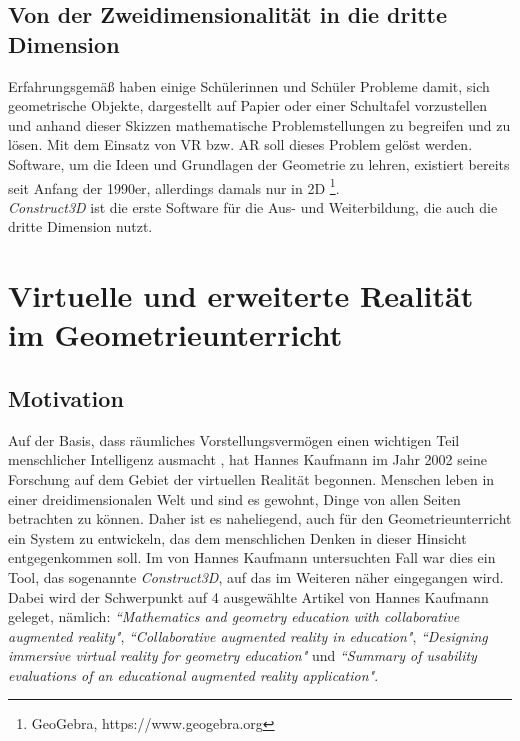 \documentclass[deutsch]{llncs}
\begin{document}
\subsection{Von der Zweidimensionalität in die dritte Dimension}
Erfahrungsgemäß haben einige Schülerinnen und Schüler Probleme damit, sich geometrische Objekte, dargestellt auf Papier oder einer Schultafel vorzustellen und anhand dieser Skizzen mathematische Problemstellungen zu begreifen und zu lösen. Mit dem Einsatz von VR bzw. AR soll dieses Problem gelöst werden.\\
Software, um die Ideen und Grundlagen der Geometrie zu lehren, existiert bereits seit Anfang der 1990er, allerdings damals nur in 2D \footnote{GeoGebra, https://www.geogebra.org}. \\
\emph{Construct3D} ist die erste Software für die Aus- und Weiterbildung, die auch die dritte Dimension nutzt. %
\section{Virtuelle und erweiterte Realität im Geometrieunterricht}
\subsection{Motivation}
Auf der Basis, dass räumliches Vorstellungsvermögen einen wichtigen Teil menschlicher Intelligenz ausmacht \cite{spatial}, hat Hannes Kaufmann im Jahr 2002 seine Forschung auf dem Gebiet der virtuellen Realität begonnen.
Menschen leben in einer dreidimensionalen Welt und sind es gewohnt, Dinge von allen Seiten betrachten zu können. Daher ist es naheliegend, auch für den Geometrieunterricht ein System zu entwickeln,
das dem menschlichen Denken in dieser Hinsicht entgegenkommen soll. Im von Hannes Kaufmann untersuchten Fall war dies ein Tool, das sogenannte \emph{Construct3D}, auf das im Weiteren näher eingegangen wird. Dabei wird der Schwerpunkt auf 4 ausgewählte Artikel von Hannes Kaufmann geleget, nämlich:  \emph{``Mathematics and geometry education with collaborative augmented reality"}\cite{Kaufmann:2002:MGE:1242073.1242086}, \emph{``Collaborative augmented reality in education"}\cite{article}, \emph{``Designing immersive virtual reality for geometry education"} \cite{1667626} und \emph{``Summary of usability evaluations of an educational augmented reality application"}\cite{Kaufmann_summaryof}. \\
\end{document}
